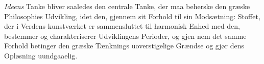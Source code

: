 \documentclass[12pt,a4paper]{book}
\begin{document}
\emph{Ideens} Tanke bliver saaledes den centrale Tanke, der
maa beherske den græske Philosophies Udvikling, idet den,
gjennem sit Forhold til sin Modsætning: Stoffet, der i Verdens\-%
kunstværket er sammensluttet til harmonisk Enhed med den,
bestemmer og charakteriserer Udviklingens Perioder, og gjen\-%
nem det samme Forhold betinger den græske Tænknings
uoverstigelige Grændse og gjør dens Opløsning uundgaaelig.
\end{document}
